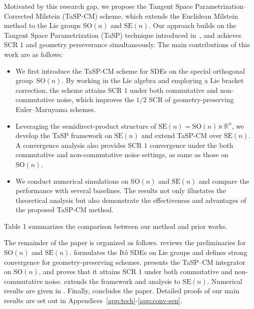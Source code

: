 \documentclass[11pt, a4paper, onecolumn]{article}
\newcommand{\SOn}{\mathrm{SO}(n)}
\newcommand{\SEn}{\mathrm{SE}(n)}
\begin{document}
Motivated by this research gap, we propose the Tangent Space Parametrization–Corrected Milstein (TaSP-CM) scheme, which extends the Euclidean Milstein method to the Lie groups $\SOn$ and $\SEn$. Our approach builds on the Tangent Space Parametrization (TaSP) technique introduced in~\cite{rabier1995numerical},  and achieves SCR $1$ and geometry perseverance simultaneously. The main contributions of this work are as follows:
\begin{itemize}
    \item We first introduce the TaSP-CM scheme for SDEs on the special orthogonal group~$\SOn$. By working in the Lie algebra and employing a Lie bracket correction, the scheme attains SCR $1$ under both commutative and non-commutative noise, which improves the $1/2$ SCR of geometry-preserving Euler–Maruyama schemes.
    \item  Leveraging the semidirect-product structure of $\SEn = \SOn \ltimes \mathbb{R}^{n}$, we develop the TaSP framework on $\SEn$ and extend TaSP-CM over $\SEn$.  A convergence analysis also provides SCR $1$ convergence under the both commutative and non-commutative noise settings, as same as those on $\SOn$.
    \item We conduct numerical simulations on $\SOn$ and $\SEn$ and compare the performance with several baselines. The results not only illustates the theoretical analysis but also demonstrate the effectiveness and advantages of the proposed TaSP-CM method.
\end{itemize}
Table 1 summarizes the comparison between our method and prior works.


The remainder of the paper is organized as follows.   reviews the preliminaries for $\SOn$ and $\SEn$.   formulates the It\^o SDEs on Lie groups and defines strong convergence for geometry-preserving schemes.   presents the TaSP–CM integrator on $\SOn$, and  proves that it attains SCR $1$ under both commutative and non-commutative noise.   extends the framework and analysis to $\mathrm{SE}(n)$.  Numerical results are given in .  Finally,  concludes the paper. Detailed proofs of our main results are set out in Appendices~\ref{app:tech}-\ref{app:conv-sen}.
\end{document}
